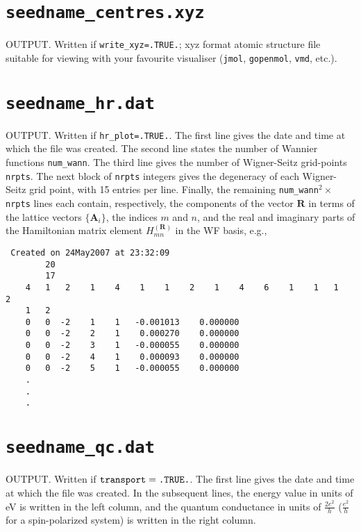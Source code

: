 \section{{\tt seedname\_centres.xyz}}

OUTPUT. Written if {\tt write\_xyz=.TRUE.}; xyz format
atomic structure file suitable for viewing with your favourite
visualiser ({\tt jmol}, {\tt gopenmol}, {\tt vmd}, etc.). 

\section{{\tt seedname\_hr.dat}}

OUTPUT. Written if {\tt hr\_plot=.TRUE.}. The first line gives the date and
time at which the file was created. 
The second line states the number of Wannier functions {\tt num\_wann}. The third
line gives the number of Wigner-Seitz grid-points {\tt nrpts}. The next block of 
{\tt nrpts} integers gives the degeneracy of each Wigner-Seitz grid point, with
15 entries per line.
Finally, the remaining {\tt num\_wann}$^2 \times$ {\tt nrpts} lines
each contain, respectively, the components of the vector $\mathbf{R}$
in terms of the lattice vectors $\{\mathbf{A}_{i}\}$, the indices $m$
and $n$, and the real and imaginary parts of the Hamiltonian matrix element
$H_{mn}^{(\mathbf{R})}$ in the WF basis, e.g.,

\begin{verbatim}
 Created on 24May2007 at 23:32:09                            
        20
        17
    4   1   2    1    4    1    1    2    1    4    6    1    1   1   2
    1   2
    0   0  -2    1    1   -0.001013    0.000000
    0   0  -2    2    1    0.000270    0.000000
    0   0  -2    3    1   -0.000055    0.000000
    0   0  -2    4    1    0.000093    0.000000
    0   0  -2    5    1   -0.000055    0.000000
    .
    .
    .
\end{verbatim}

\section{{\tt seedname\_qc.dat}}
OUTPUT. Written if $\verb#transport#=\verb#.TRUE.#$.
The first line gives the date and
time at which the file was created. 
In the subsequent lines, the energy value
in units of eV is written in the left column,
and the quantum conductance in units of 
$\frac{2e^2}{h}$ ($\frac{e^2}{h}$
for a spin-polarized system)
is written in the right column.

